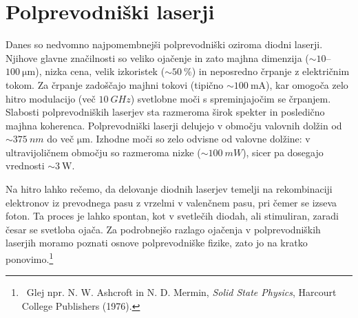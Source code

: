\section{Polprevodniški laserji}
\label{chap:SCL}
Danes so nedvomno najpomembnejši polprevodniški oziroma diodni 
laserji.
Njihove glavne značilnosti so veliko ojačenje in zato majhna 
dimenzija ($\sim 10$--$100~\si{\micro\metre}$), nizka cena, 
velik izkoristek ($\sim 50~\%$) in neposredno črpanje z električnim tokom. 
Za črpanje zadoščajo majhni tokovi 
(tipično $\sim 100~\si{\milli\ampere}$), kar omogoča zelo hitro modulacijo (več $10~\si{GHz}$)
svetlobne moči s spreminjajočim se črpanjem. Slabosti polprevodniških laserjev sta razmeroma širok 
spekter in posledično majhna koherenca. Polprevodniški laserji delujejo v območju 
valovnih dolžin od $\sim 375~\si{nm}$ do več $\si{\micro\meter}$. Izhodne moči
so zelo odvisne od valovne dolžine: v ultravijoličnem 
območju so razmeroma nizke ($\sim 100~\si{mW}$),
sicer pa dosegajo vrednosti $\sim 3~\si{\watt}$.

Na hitro lahko rečemo, da delovanje diodnih laserjev temelji na rekombinaciji  
elektronov iz prevodnega pasu z vrzelmi v valenčnem pasu, pri čemer se izseva foton. Ta proces je lahko 
spontan, kot v svetlečih diodah, ali stimuliran, zaradi česar se svetloba ojača. 
Za podrobnejšo razlago ojačenja v polprevodniških 
laserjih moramo poznati osnove polprevodniške fizike, zato jo na kratko 
ponovimo.\footnote{~Glej npr. N. W. Ashcroft in N. D. Mermin, {\it Solid State Physics}, Harcourt College
Publishers (1976).}

